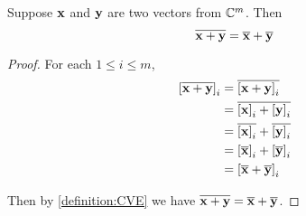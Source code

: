 \documentclass{ximera}
\begin{document}
\begin{theorem}
  \label{theorem:CRVA}
  
  Suppose $\mathbf{x}$ and $\mathbf{y}$ are two vectors from $\mathbb{C}^{m}$.  Then
  \[
    \overline{\mathbf{x}+\mathbf{y}}=\overline{\mathbf{x}}+\overline{\mathbf{y}}
  \]
  
  \begin{proof}
    For each $1\leq i\leq m$,
    \begin{align*}
      \vectorentry{\conjugate{\vect{x}+\vect{y}}}{i}
      &=\conjugate{\vectorentry{\vect{x}+\vect{y}}{i}}\\ %
      &=\conjugate{\vectorentry{\vect{x}}{i}+\vectorentry{\vect{y}}{i}}\\ %
      &=\conjugate{\vectorentry{\vect{x}}{i}}+\conjugate{\vectorentry{\vect{y}}{i}}\\ %
      &=\vectorentry{\conjugate{\vect{x}}}{i}+\vectorentry{\conjugate{\vect{y}}}{i}\\ %
      &=\vectorentry{\conjugate{\vect{x}}+\conjugate{\vect{y}}}{i}\\ %
    \end{align*}
    
    
    Then by \ref{definition:CVE} we have $\overline{\mathbf{x}+\mathbf{y}}=\overline{\mathbf{x}}+\overline{\mathbf{y}}$.
    
  \end{proof}
\end{theorem}
\end{document}
